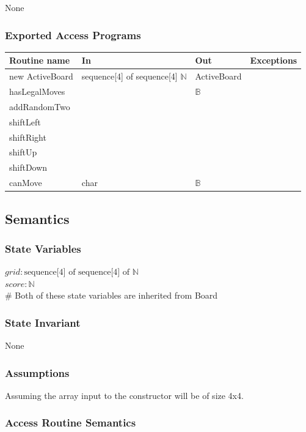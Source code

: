 \documentclass[12pt]{article}
\begin{document}
None

\subsubsection* {Exported Access Programs}

\begin{tabular}{| l | l | l | p{5cm} |}
\hline
\textbf{Routine name} & \textbf{In} & \textbf{Out} & \textbf{Exceptions}\\
\hline
new ActiveBoard & sequence[4] of sequence[4] $\mathbb{N}$ & ActiveBoard &~\\
\hline
hasLegalMoves & & $\mathbb{B}$ &~\\
\hline
addRandomTwo & & &~\\
\hline
shiftLeft & & &~\\
\hline
shiftRight & & &~\\
\hline
shiftUp & & &~\\
\hline
shiftDown & & &~\\
\hline
canMove & char & $\mathbb{B}$ &~\\
\hline
\end{tabular}

\subsection*{Semantics}

\subsubsection*{State Variables}

$\mathit{grid}: \text{sequence[4] of sequence[4] of } \mathbb{N}$\\
$\mathit{score}: \mathbb{N}$ \\
\# Both of these state variables are inherited from Board

\subsubsection*{State Invariant}

None

\subsubsection*{Assumptions}

Assuming the array input to the constructor will be of size 4x4.

\subsubsection*{Access Routine Semantics}
\end{document}
